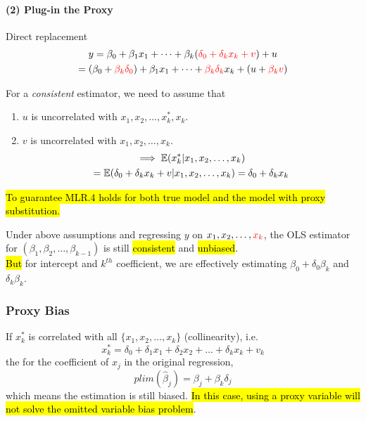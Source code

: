 \documentclass[]{article}
\begin{document}
				
				\paragraph{(2) Plug-in the Proxy} Direct replacement
				\begin{gather}
					y = \beta_0 + \beta_1 x_1 + \dots + \beta_k (\textcolor{red}{\delta_0 + \delta_k x_k + v}) + u\\
					= (\beta_0 + \textcolor{red}{\beta_k \delta_0}) + \beta_1 x_1 + \dots + \textcolor{red}{\beta_k \delta_k} x_k + (u + \textcolor{red}{\beta_k v})
				\end{gather}
				\begin{assumption}
					For a \emph{consistent} estimator, we need to assume that
					\begin{enumerate}
						\item $u$ is uncorrelated with $x_1, x_2, \dots, x_k^{*}, x_k$.
						\item $v$ is uncorrelated with $x_1, x_2, \dots, x_k$.
						\begin{gather}
							\implies \mathbb{E}({x_k^{*}|x_1,x_2,\dots,x_k}) \\
							= \mathbb{E}({\delta_0 + \delta_k x_k + v|x_1,x_2,\dots,x_k}) = \delta_0 + \delta_k x_k
						\end{gather}
					\end{enumerate}
					\hl{To guarantee MLR.4 holds for both true model and the model with proxy substitution.}
				\end{assumption}
				\begin{remark}
					Under above assumptions and regressing $y$ on $x_1, x_2, \dots, \textcolor{red}{x_k}$, the OLS estimator for $(\beta_1, \beta_2, \dots, \beta_{k-1})$ is still \hl{consistent} and \hl{unbiased}.\\
					 \hl{But} for intercept and $k^{th}$ coefficient, we are effectively estimating $\beta_0 + \delta_0 \beta_k$ and $\delta_k \beta_k$.
				\end{remark}
			\subsubsection{Proxy Bias}
				If $x_k^{*}$ is correlated with all $\{x_1, x_2, \dots, x_k\}$ (collinearity), i.e. 
				\[
					x_k^{*} = \delta_0 + \delta_1 x_1 + \delta_2 x_2 + \dots + \delta_k x_k + v_k
				\]
				the for the coefficient of $x_j$ in the original regression, 
				\[
					plim(\hat{\beta}_j) = \beta_j + \beta_k \delta_j
				\]
				which means the estimation is still biased. \hl{In this case, using a proxy variable will not solve the omitted variable bias problem}.
				
\end{document}
